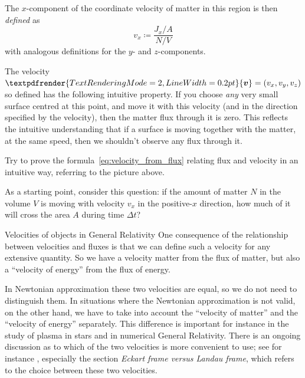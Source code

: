 \documentclass[a4paper,12pt,%
onecolumn,oneside,%
british%
]{memoir}
\renewcommand*{\bm}[1]{\textpdfrender{TextRenderingMode=2,LineWidth=0.2pt}{\boldsymbol{#1}}}
\newcommand*{\incr}{\Delta}%
\newcommand*{\defd}{\coloneqq}
\renewcommand*{\|}[1][]{\nonscript\:#1\vert\nonscript\:\mathopen{}}
\newcommand*{\yv}{\bm{v}}
\newcommand*{\Dt}{\incr t}
\newcommand*{\yN}{N}
\begin{document}
The $x$-component of the coordinate velocity of matter in this region is then \emph{defined} as
\begin{equation}
  \label{eq:velocity_from_flux}
  v_{x} \defd \frac{J_{x}/A}{\yN/V}
\end{equation}
with analogous definitions for the $y$- and $z$-components.


The velocity $\yv=(v_{x}, v_{y}, v_{z})$ so defined has the following intuitive property. If you choose \emph{any} very small surface centred at this point, and move it with this velocity (and in the direction specified by the velocity), then the matter flux through it is zero. This reflects the intuitive understanding that if a surface is moving together with the matter, at the same speed, then we shouldn't observe any flux through it.

\begin{exercise}
  Try to prove the formula~\eqref{eq:velocity_from_flux} relating flux and velocity in an intuitive way, referring to the picture above.

  As a starting point, consider this question: if the amount of matter $\yN$ in the volume $V$ is moving with velocity $v_{x}$ in the positive-$x$ direction, how much of it will cross the area $A$ during time $\Dt$?
\end{exercise}

\medskip


\begin{extra}{Velocities of objects in General Relativity}
  One consequence of the relationship between velocities and fluxes is that we can define such a velocity for any extensive quantity. So we have a velocity matter from the flux of matter, but also a \enquote{velocity of energy} from the flux of energy.

  In Newtonian approximation these two velocities are equal, so we do not need to distinguish them. In situations where the Newtonian approximation is not valid, on the other hand, we have to take into account the \enquote{velocity of matter} and the \enquote{velocity of energy} separately. This difference is important for instance in the study of plasma in stars and in numerical General Relativity. There is an ongoing discussion as to which of the two velocities is more convenient to use; see for instance \cites{kandusetal2008}, especially the section \emph{Eckart frame versus Landau frame}, which refers to the choice between these two velocities.
\end{extra}
\end{document}
